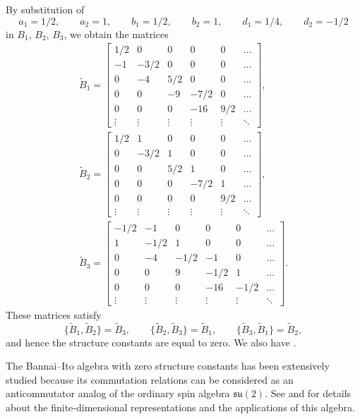 \documentclass[10pt,a4paper]{amsart}
\numberwithin{equation}{section}
\begin{document}
By substitution of
		\[ a_1=1/2,\qquad a_2=1,\qquad b_1=1/2,\qquad b_2=1,\qquad d_1=1/4,\qquad d_2=-1/2 \]
in $B_1$, $B_2$, $B_3$, we obtain the matrices
	\begin{gather*}%
		\tilde{B}_1= \begin{bmatrix} 1/2 & 0 & 0 & 0 & 0 & \dots \\
			-1  & -3/2 & 0 & 0 & 0 & \dots \\
			0 & -4  & 5/2  & 0 & 0  & \dots \\
			0 & 0 & -9  & -7/2 & 0 & \dots \\
      0 & 0 & 0  & -16  & 9/2 & \dots \\
		\vdots  & \vdots  & \vdots  & \vdots & \vdots  &  \ddots  \end{bmatrix},
\\%
	\tilde{B}_2 = \begin{bmatrix} 1/2 & 1 & 0 & 0 & 0 & \dots \\
			0 & -3/2 & 1 & 0 & 0 & \dots \\
			0 & 0  & 5/2  & 1 &0 & \dots \\
			0 & 0 & 0 & -7/2 & 1 & \dots \\
      0 & 0 & 0  & 0  & 9/2  & \dots \\
		\vdots  & \vdots  & \vdots  & \vdots  & \vdots  & \ddots  \end{bmatrix},
\\%
		\tilde{B}_3 = \begin{bmatrix} -1/2 & -1 & 0 & 0 & 0 & \dots \\
			1 & -1/2 & 1 & 0 & 0 & \dots \\
			0 & -4 & -1/2  & -1 &0 & \dots \\
			0 & 0 & 9 & -1/2 & 1 & \dots \\
      0 & 0 & 0  & -16  & -1/2  & \dots \\
		\vdots  & \vdots  & \vdots  & \vdots  & \vdots  & \ddots  \end{bmatrix}.
\end{gather*}
These matrices satisfy
\[ \bigl\{\tilde{B}_1, \tilde{B}_2\bigr\}= \tilde{B}_3,\qquad \bigl\{\tilde{B}_2, \tilde{B}_3\bigr\}= \tilde{B}_1, \qquad \bigl\{\tilde{B}_3, \tilde{B}_1\bigr\}= \tilde{B}_2, \]
			and hence the structure constants are equal to zero. We also have .

The Bannai--Ito algebra with zero structure constants has been extensively studied because its commutation relations can be considered as an anticommutator analog of the ordinary spin algebra $\mathfrak{su}(2)$.
See \cite{Brown} and \cite{GVYZ} for details about the finite-dimensional representations and the applications of this algebra.
			
\end{document}
